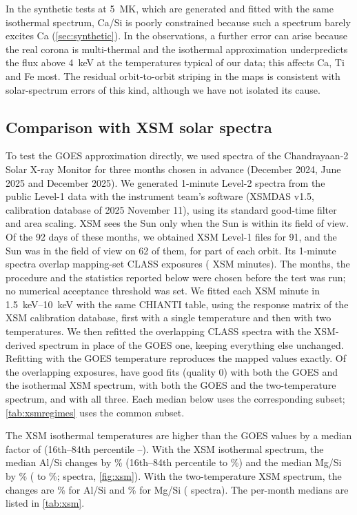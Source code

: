 In the synthetic tests at \SI{5}{MK}, which are generated and fitted with the same isothermal spectrum, Ca/Si is poorly constrained because such a spectrum barely excites Ca (\cref{sec:synthetic}). In the observations, a further error can arise because the real corona is multi-thermal and the isothermal approximation underpredicts the flux above \SI{4}{keV} at the temperatures typical of our data; this affects Ca, Ti and Fe most. The residual orbit-to-orbit striping in the maps is consistent with solar-spectrum errors of this kind, although we have not isolated its cause.

\subsection{Comparison with XSM solar spectra}\label{sec:xsm}
To test the GOES approximation directly, we used spectra of the Chandrayaan-2 Solar X-ray Monitor \citep{Mithun2020} for three months chosen in advance (December 2024, June 2025 and December 2025). We generated 1-minute Level-2 spectra from the public Level-1 data with the instrument team's software (XSMDAS v1.5, calibration database of 2025 November 11), using its standard good-time filter and area scaling. XSM sees the Sun only when the Sun is within its field of view. Of the 92 days of these months, we obtained XSM Level-1 files for 91, and the Sun was in the field of view on 62 of them, for part of each orbit. Its 1-minute spectra overlap \XsmNClass{} mapping-set CLASS exposures (\XsmNMin{} XSM minutes). The months, the procedure and the statistics reported below were chosen before the test was run; no numerical acceptance threshold was set. We fitted each XSM minute in \SIrange{1.5}{10}{keV} with the same CHIANTI table, using the response matrix of the XSM calibration database, first with a single temperature and then with two temperatures. We then refitted the overlapping CLASS spectra with the XSM-derived spectrum in place of the GOES one, keeping everything else unchanged. Refitting with the GOES temperature reproduces the mapped values exactly. Of the overlapping exposures, \XsmOneN{} have good fits (quality 0) with both the GOES and the isothermal XSM spectrum, \XsmTwoN{} with both the GOES and the two-temperature spectrum, and \XsmNBoth{} with all three. Each median below uses the corresponding subset; \cref{tab:xsmregimes} uses the common subset.

The XSM isothermal temperatures are higher than the GOES values by a median factor of \XsmTRatio{} (16th--84th percentile \XsmTRatioLo--\XsmTRatioHi). With the XSM isothermal spectrum, the median Al/Si changes by \XsmOneAl\% (16th--84th percentile \XsmOneAlLo{} to \XsmOneAlHi\%) and the median Mg/Si by \XsmOneMg\% (\XsmOneMgLo{} to \XsmOneMgHi\%; \XsmOneN{} spectra, \cref{fig:xsm}). With the two-temperature XSM spectrum, the changes are \XsmTwoAl\% for Al/Si and \XsmTwoMg\% for Mg/Si (\XsmTwoN{} spectra). The per-month medians are listed in \cref{tab:xsm}.

